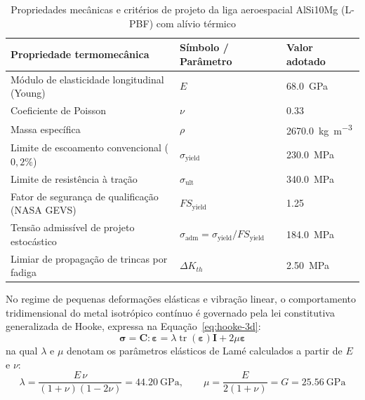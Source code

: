 \begin{table}[htb]
  \caption{Propriedades mecânicas e critérios de projeto da liga aeroespacial AlSi10Mg (L-PBF) com alívio térmico}
  \label{tab:propriedades-alsi10mg}
  \small
  \SingleSpacing
  \begin{tabularx}{\textwidth}{@{}>{\raggedright\arraybackslash}X >{\centering\arraybackslash}p{3.5cm} >{\centering\arraybackslash}p{4.0cm}@{}}
    \toprule
    \textbf{Propriedade termomecânica} & \textbf{Símbolo / Parâmetro} & \textbf{Valor adotado} \\
    \midrule
    Módulo de elasticidade longitudinal (Young) & $E$ & \SI{68.0}{\giga\pascal} \\
    Coeficiente de Poisson & $\nu$ & \num{0.33} \\
    Massa específica & $\rho$ & \SI{2670.0}{\kilo\gram\per\cubic\metre} \\
    Limite de escoamento convencional ($0{,}2\%$) & $\sigma_{\text{yield}}$ & \SI{230.0}{\mega\pascal} \\
    Limite de resistência à tração & $\sigma_{\text{ult}}$ & \SI{340.0}{\mega\pascal} \\
    Fator de segurança de qualificação (NASA GEVS) & $FS_{\text{yield}}$ & \num{1.25} \\
    Tensão admissível de projeto estocástico & $\sigma_{\text{adm}} = \sigma_{\text{yield}} / FS_{\text{yield}}$ & \SI{184.0}{\mega\pascal} \\
    Limiar de propagação de trincas por fadiga & $\Delta K_{th}$ & \SI{2.50}{\mega\pascal\sqrt{\metre}} \\
    \bottomrule
  \end{tabularx}
\end{table}

No regime de pequenas deformações elásticas e vibração linear, o comportamento tridimensional do metal isotrópico contínuo é governado pela lei constitutiva generalizada de Hooke, expressa na Equação~\eqref{eq:hooke-3d}:
\begin{equation}
  \boldsymbol{\sigma} = \mathbf{C} : \boldsymbol{\varepsilon} = \lambda \operatorname{tr}(\boldsymbol{\varepsilon})\mathbf{I} + 2\mu\boldsymbol{\varepsilon}
  \label{eq:hooke-3d}
\end{equation}
na qual $\lambda$ e $\mu$ denotam os parâmetros elásticos de Lamé calculados a partir de $E$ e $\nu$:
\begin{equation}
  \lambda = \frac{E\,\nu}{(1+\nu)(1-2\nu)} = \SI{44.20}{\giga\pascal}, \qquad \mu = \frac{E}{2(1+\nu)} = G = \SI{25.56}{\giga\pascal}
  \label{eq:lame}
\end{equation}

